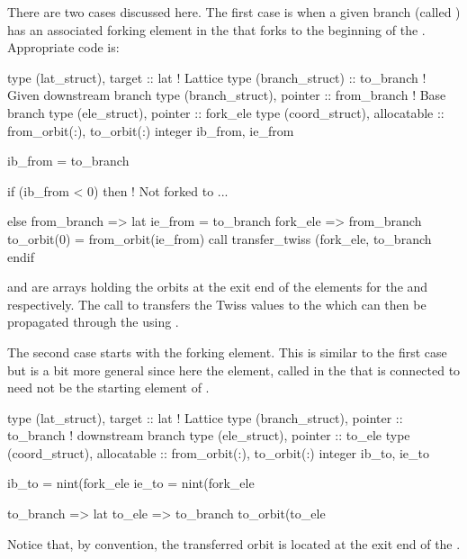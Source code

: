 {{{{{{{{There are two cases discussed here. The first case is when a given
branch (called ) has an associated forking element in
the  that forks to the beginning of the
. Appropriate code is:
\begin{example}
  type (lat_struct), target :: lat   ! Lattice 
  type (branch_struct) :: to_branch  ! Given downstream branch
  type (branch_struct), pointer  :: from_branch ! Base branch
  type (ele_struct), pointer :: fork_ele
  type (coord_struct), allocatable :: from_orbit(:), to_orbit(:)
  integer ib_from, ie_from

  ib_from  = to_branch%

  if (ib_from < 0) then
    ! Not forked to ...

  else
    from_branch => lat%
    ie_from = to_branch%
    fork_ele => from_branch%
    to_orbit(0) = from_orbit(ie_from)
    call transfer_twiss (fork_ele, to_branch%
  endif
\end{example}
 and  are arrays holding the
orbits at the exit end of the elements for the  and
 respectively. The call to 
transfers the Twiss values to the  which can then be
propagated through the  using .

The second case starts with the  forking element.  This
is similar to the first case but is a bit more general since here the
element, called  in the  that is connected to
 need not be the starting element of .
\begin{example}
  type (lat_struct), target :: lat   ! Lattice 
  type (branch_struct), pointer :: to_branch  ! downstream branch
  type (ele_struct), pointer :: to_ele
  type (coord_struct), allocatable :: from_orbit(:), to_orbit(:)
  integer ib_to, ie_to

  ib_to  = nint(fork_ele%
  ie_to  = nint(fork_ele%

  to_branch => lat%
  to_ele => to_branch%
  to_orbit(to_ele%
\end{example}  
Notice that, by convention, the transferred orbit is located at the
exit end of the .

}}}}}}}}
